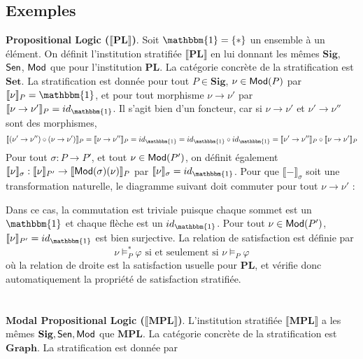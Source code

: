 \documentclass[11pt,a4paper]{article}
\newcommand{\ph}{\varphi}
\newcommand{\gr}{\textbf}
\newcommand{\lb}{\llbracket}
\newcommand{\rb}{\rrbracket}
\newcommand{\info}[1]{\text{{\fontfamily{lmss}\selectfont #1}}}
\newcommand{\Mod}{\info{Mod}}
\newcommand{\Sen}{\info{Sen}}
\newcommand{\1}{\mathbbm{1}}
\begin{document}
\subsection{Exemples}
\gr{Propositional Logic ($\lb \gr{PL} \rb$)}.  Soit $\1 = \{*\}$ un ensemble à un élément. On définit l'institution stratifiée $\lb \gr{PL} \rb$ en lui donnant les mêmes $\gr{Sig}$, $\Sen$, $\Mod$ que pour l'institution $\gr{PL}$. La catégorie concrète de la stratification est $\gr{Set}$. La stratification est donnée pour tout $P \in \gr{Sig}$, $\nu \in \Mod(P)$ par $\lb \nu \rb_P = \1$, et pour tout morphisme $\nu \to \nu'$ par $\lb \nu \to \nu' \rb_P = id_\1$. Il s'agit bien d'un foncteur, car si $\nu \to \nu'$ et $\nu' \to \nu''$ sont des morphismes, 
\[ \lb (\nu' \to \nu'') \circ (\nu \to \nu') \rb_P = \lb \nu \to \nu'' \rb_P = id_\1 = id_\1 \circ id_\1 = \lb \nu' \to \nu'' \rb_P \circ \lb \nu \to \nu' \rb_P \]
Pour tout $\sigma : P \to P'$, et tout $\nu \in \Mod(P')$, on définit également $\lb \nu \rb_\sigma : \lb \nu \rb_{P'} \to \lb \Mod(\sigma)(\nu) \rb_P$ par $\lb \nu \rb_\sigma =id_\1$. Pour que $\lb - \rb_\sigma$ soit une transformation naturelle, le diagramme suivant doit commuter pour tout $\nu \to \nu'$ :
\begin{center}
\end{center}
Dans ce cas, la commutation est triviale puisque chaque sommet est un $\1$ et chaque flèche est un $id_\1$. Pour tout $\nu \in \Mod(P')$, $\lb \nu \rb_{P'} = id_\1$ est bien surjective. La relation de satisfaction est définie par 
\[ \nu \models_P^* \ph \text{ si et seulement si } \nu \models_P \ph \]
où la relation de droite est la satisfaction usuelle pour $\gr{PL}$, et vérifie donc automatiquement la propriété de satisfaction stratifiée.\\\\\\
\gr{Modal Propositional Logic ($\lb \gr{MPL} \rb$)}. L'institution stratifiée $\lb \gr{MPL} \rb$ a les mêmes $\gr{Sig}, \Sen, \Mod$ que $\gr{MPL}$. La catégorie concrète de la stratification est $\gr{Graph}$. La stratification est donnée par
\end{document}

